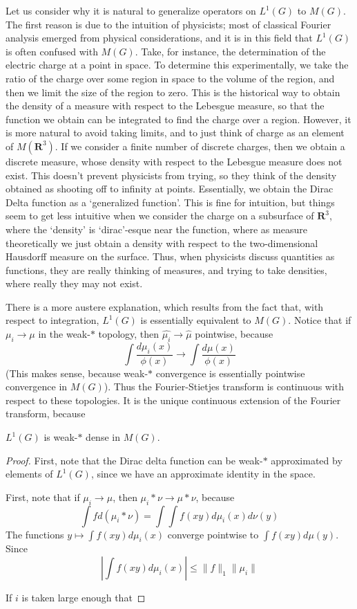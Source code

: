 Let us consider why it is natural to generalize operators on $L^1(G)$ to $M(G)$. The first reason is due to the intuition of physicists; most of classical Fourier analysis emerged from physical considerations, and it is in this field that $L^1(G)$ is often confused with $M(G)$. Take, for instance, the determination of the electric charge at a point in space. To determine this experimentally, we take the ratio of the charge over some region in space to the volume of the region, and then we limit the size of the region to zero. This is the historical way to obtain the density of a measure with respect to the Lebesgue measure, so that the function we obtain can be integrated to find the charge over a region. However, it is more natural to avoid taking limits, and to just think of charge as an element of $M(\mathbf{R}^3)$. If we consider a finite number of discrete charges, then we obtain a discrete measure, whose density with respect to the Lebesgue measure does not exist. This doesn't prevent physicists from trying, so they think of the density obtained as shooting off to infinity at points. Essentially, we obtain the Dirac Delta function as a `generalized function'. This is fine for intuition, but things seem to get less intuitive when we consider the charge on a subsurface of $\mathbf{R}^3$, where the `density' is `dirac'-esque near the function, where as measure theoretically we just obtain a density with respect to the two-dimensional Hausdorff measure on the surface. Thus, when physicists discuss quantities as functions, they are really thinking of measures, and trying to take densities, where really they may not exist.

There is a more austere explanation, which results from the fact that, with respect to integration, $L^1(G)$ is essentially equivalent to $M(G)$. Notice that if $\mu_i \to \mu$ in the weak-$*$ topology, then $\widehat{\mu_i} \to \widehat{\mu}$ pointwise, because
%
\[ \int \frac{d\mu_i(x)}{\phi(x)} \to \int \frac{d\mu(x)}{\phi(x)} \]
%
(This makes sense, because weak-$*$ convergence is essentially pointwise convergence in $M(G)$). Thus the Fourier-Stietjes transform is continuous with respect to these topologies. It is the unique continuous extension of the Fourier transform, because

\begin{theorem}
    $L^1(G)$ is weak-$*$ dense in $M(G)$.
\end{theorem}
\begin{proof}
    First, note that the Dirac delta function can be weak-$*$ approximated by elements of $L^1(G)$, since we have an approximate identity in the space.

    First, note that if $\mu_i \to \mu$, then $\mu_i * \nu \to \mu * \nu$, because
    \[ \int f d(\mu_i * \nu) = \int \int f(xy) d\mu_i(x) d\nu(y) \]
    The functions $y \mapsto \int f(xy) d\mu_i(x)$ converge pointwise to $\int f(xy) d\mu(y)$. Since
    \[ \left| \int f(xy) d\mu_i(x) \right| \leq \| f \|_1 \| \mu_i \| \]

    If $i$ is taken large enough that
\end{proof}

